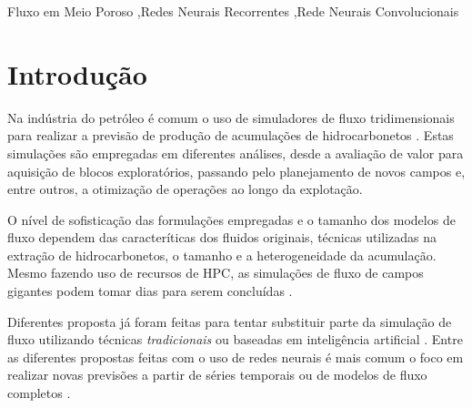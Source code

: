 \documentclass[final,5p]{elsarticle}
\numberwithin{equation}{section}
\begin{document}
\begin{frontmatter}


\begin{keyword}
    Fluxo em Meio Poroso \sep Redes Neurais Recorrentes \sep Rede Neurais Convolucionais



\end{keyword}

\end{frontmatter}

\section{Introdução}

    Na indústria do petróleo é comum o uso de simuladores de fluxo tridimensionais para realizar a previsão de produção de acumulações de hidrocarbonetos \cite{rosa2006engenharia,dake1983fundamentals}. Estas simulações são empregadas em diferentes análises, desde a avaliação de valor para aquisição de blocos exploratórios, passando pelo planejamento de novos campos e, entre outros, a otimização de operações ao longo da explotação.

    O nível de sofisticação das formulações empregadas e o tamanho dos modelos de fluxo dependem das caracteríticas dos fluidos originais, técnicas utilizadas na extração de hidrocarbonetos, o tamanho e a heterogeneidade da acumulação. Mesmo fazendo uso de recursos de HPC, as simulações de fluxo de campos gigantes podem tomar dias para serem concluídas \cite{10.2118/149132-MS}.

    Diferentes proposta já foram feitas para tentar substituir parte da simulação de fluxo utilizando técnicas \emph{tradicionais} \cite{amorim2012risk} ou baseadas em inteligência artificial \cite{ertekin2019artificial}. Entre as diferentes propostas feitas com o uso de redes neurais é mais comum o foco em realizar novas previsões a partir de séries temporais \cite{de2022data, davtyan2020oil, kim2021recurrent} ou de modelos de fluxo completos \cite{cirac2023deep}.
\end{document}

